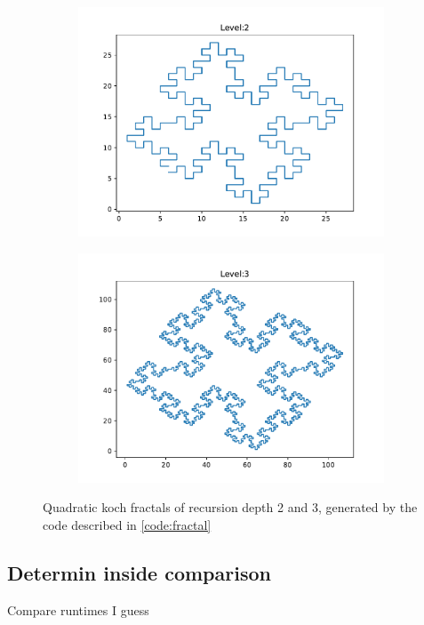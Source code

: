 \documentclass{article}
\begin{document}
\begin{figure}
    \begin{subfigure}{0.5\textwidth}
        \includegraphics[width=\linewidth]{./media/quad_koch_level2.pdf}
    \end{subfigure}
    \begin{subfigure}{0.5\textwidth}
        \includegraphics[width=\linewidth]{./media/quad_koch_level3.pdf}
    \end{subfigure}
    \caption{Quadratic koch fractals of recursion depth 2 and 3, generated by the code described in \ref{code:fractal}}
\end{figure}

\subsection{Determin inside comparison}
Compare runtimes I guess
\end{document}
